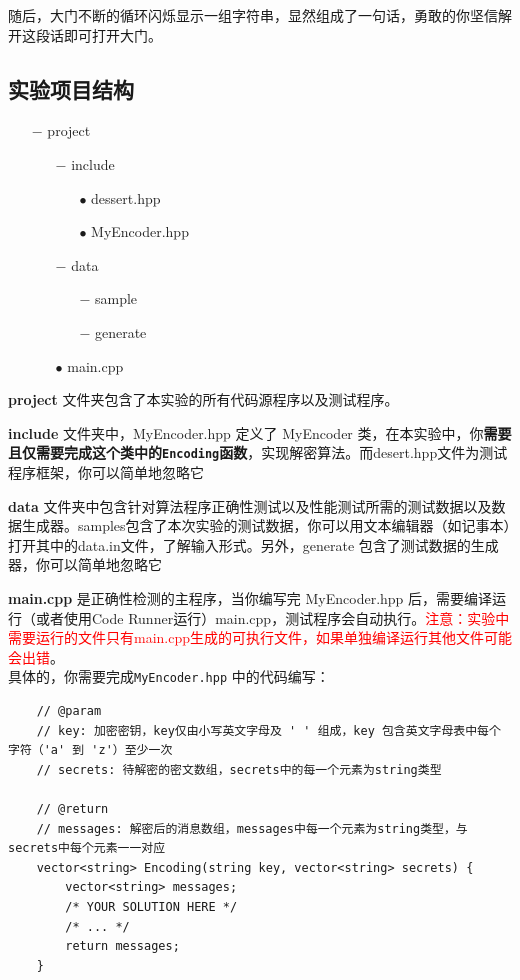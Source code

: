\documentclass{article}
\begin{document}
随后，大门不断的循环闪烁显示一组字符串，显然组成了一句话，勇敢的你坚信解开这段话即可打开大门。

\subsection{实验项目结构}

\begin{itemize}[noitemsep]
    \item[$-$] project
        \begin{itemize}[noitemsep]
            \item[$-$] include
                \begin{itemize}[noitemsep]
                    \item[$\bullet$] dessert.hpp
                    \item[$\bullet$] MyEncoder.hpp
                \end{itemize}
            \item[$-$] data
                \begin{itemize}[noitemsep]
                    \item[$-$] sample
                    \item[$-$] generate
                \end{itemize}
            \item[$\bullet$] main.cpp
        \end{itemize}
\end{itemize}

\textbf{project} 文件夹包含了本实验的所有代码源程序以及测试程序。

\textbf{include} 文件夹中，MyEncoder.hpp 定义了 MyEncoder 类，在本实验中，你\textbf{需要且仅需要完成这个类中的\texttt{Encoding}函数}，实现解密算法。而desert.hpp文件为测试程序框架，你可以简单地忽略它

\textbf{data} 文件夹中包含针对算法程序正确性测试以及性能测试所需的测试数据以及数据生成器。samples包含了本次实验的测试数据，你可以用文本编辑器（如记事本）打开其中的data.in文件，了解输入形式。另外，generate 包含了测试数据的生成器，你可以简单地忽略它

\textbf{main.cpp} 是正确性检测的主程序，当你编写完 MyEncoder.hpp 后，需要编译运行（或者使用Code Runner运行）main.cpp，测试程序会自动执行。\textcolor{red}{注意：实验中需要运行的文件只有main.cpp生成的可执行文件，如果单独编译运行其他文件可能会出错}。\\


具体的，你需要完成\texttt{MyEncoder.hpp} 中的代码编写：
\begin{lstlisting}
	// @param
	// key: 加密密钥，key仅由小写英文字母及 ' ' 组成，key 包含英文字母表中每个字符（'a' 到 'z'）至少一次
	// secrets: 待解密的密文数组，secrets中的每一个元素为string类型

	// @return
	// messages: 解密后的消息数组，messages中每一个元素为string类型，与secrets中每个元素一一对应
	vector<string> Encoding(string key, vector<string> secrets) {
		vector<string> messages;
		/* YOUR SOLUTION HERE */
		/* ... */
		return messages;
	}
\end{lstlisting}
\end{document}
